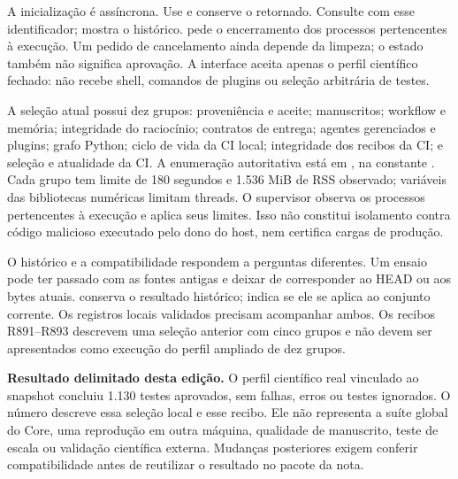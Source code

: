\begin{metodo}
A inicialização é assíncrona. Use
 e
conserve o  retornado. Consulte 
com esse identificador;  mostra o histórico.
 pede o encerramento dos processos pertencentes
à execução. Um pedido de cancelamento ainda depende da limpeza; o estado
 também não significa aprovação. A interface aceita apenas o
perfil científico fechado: não recebe shell, comandos de plugins ou seleção
arbitrária de testes.
\end{metodo}

\begin{resultado}
A seleção atual possui dez grupos: proveniência e aceite; manuscritos;
workflow e memória; integridade do raciocínio; contratos de entrega;
agentes gerenciados e plugins; grafo Python; ciclo de vida da CI local;
integridade dos recibos da CI; e seleção e atualidade da CI. A enumeração
autoritativa está em , na constante
. Cada grupo tem limite de 180 segundos e 1.536 MiB de
RSS observado; variáveis das bibliotecas numéricas limitam threads. O
supervisor observa os processos pertencentes à execução e aplica seus limites.
Isso não constitui isolamento contra código malicioso executado pelo dono do
host, nem certifica cargas de produção.
\end{resultado}

\begin{descricao}
O histórico e a compatibilidade respondem a perguntas diferentes. Um ensaio
pode ter passado com as fontes antigas e deixar de corresponder ao HEAD ou
aos bytes atuais.  conserva o resultado histórico;
 indica se ele se aplica ao conjunto corrente.
Os registros locais validados precisam acompanhar ambos. Os recibos R891--R893
descrevem uma seleção anterior com cinco grupos e não devem ser apresentados
como execução do perfil ampliado de dez grupos.
\end{descricao}

\begin{resultado}
\textbf{Resultado delimitado desta edição.} O perfil científico real vinculado
ao snapshot  concluiu 1.130 testes aprovados, sem falhas, erros
ou testes ignorados. O número descreve essa seleção local e esse recibo.
Ele não representa a suíte global do Core, uma reprodução em outra máquina,
qualidade de manuscrito, teste de escala ou validação científica externa.
Mudanças posteriores exigem conferir compatibilidade antes de reutilizar o
resultado no pacote da nota.
\end{resultado}

